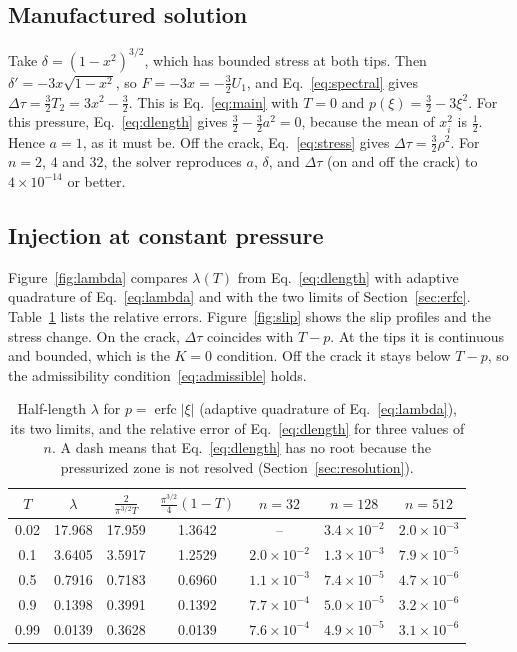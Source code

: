 \documentclass[12pt]{article}
\newcommand{\erfc}{\operatorname{erfc}}
\begin{document}
\subsection{Manufactured solution}
Take $\delta = (1-x^2)^{3/2}$, which has bounded stress at both tips. Then
$\delta' = -3x\sqrt{1-x^2}$, so $F = -3x = -\frac32U_1$, and
Eq.~\eqref{eq:spectral} gives $\Delta\tau = \frac32T_2 = 3x^2-\frac32$. This is
Eq.~\eqref{eq:main} with $T=0$ and $p(\xi) = \frac32 - 3\xi^2$. For this pressure,
Eq.~\eqref{eq:dlength} gives $\frac32 - \frac32a^2 = 0$, because the mean of
$x_i^2$ is $\frac12$. Hence $a=1$, as it must be. Off the crack,
Eq.~\eqref{eq:stress} gives $\Delta\tau = \frac32\rho^2$. For $n = 2$, $4$ and
$32$, the solver reproduces $a$, $\delta$, and $\Delta\tau$ (on and off the
crack) to $4\times10^{-14}$ or better.

\subsection{Injection at constant pressure}
Figure~\ref{fig:lambda} compares $\lambda(T)$ from Eq.~\eqref{eq:dlength} with
adaptive quadrature of Eq.~\eqref{eq:lambda} and with the two limits of
Section~\ref{sec:erfc}. Table~\ref{tab:lambda} lists the relative errors.
Figure~\ref{fig:slip} shows the slip profiles and the stress change. On the
crack, $\Delta\tau$ coincides with $T-p$. At the tips it is continuous and
bounded, which is the $K=0$ condition. Off the crack it stays below $T-p$, so
the admissibility condition~\eqref{eq:admissible} holds.

\begin{table}[H]
	\centering
	\caption{Half-length $\lambda$ for $p=\erfc|\xi|$ (adaptive quadrature of
		Eq.~\eqref{eq:lambda}), its two limits, and the relative error of
		Eq.~\eqref{eq:dlength} for three values of $n$. A dash means that
		Eq.~\eqref{eq:dlength} has no root because the pressurized zone is not
		resolved (Section~\ref{sec:resolution}).}
	\label{tab:lambda}
	\begin{tabular}{ccccccc}
		\hline
		$T$  & $\lambda$ & $\frac{2}{\pi^{3/2}T}$ & $\frac{\pi^{3/2}}{4}(1-T)$ & $n=32$             & $n=128$            & $n=512$            \\
		\hline
		0.02 & 17.968    & 17.959                 & 1.3642                     & --                 & $3.4\times10^{-2}$ & $2.0\times10^{-3}$ \\
		0.1  & 3.6405    & 3.5917                 & 1.2529                     & $2.0\times10^{-2}$ & $1.3\times10^{-3}$ & $7.9\times10^{-5}$ \\
		0.5  & 0.7916    & 0.7183                 & 0.6960                     & $1.1\times10^{-3}$ & $7.4\times10^{-5}$ & $4.7\times10^{-6}$ \\
		0.9  & 0.1398    & 0.3991                 & 0.1392                     & $7.7\times10^{-4}$ & $5.0\times10^{-5}$ & $3.2\times10^{-6}$ \\
		0.99 & 0.0139    & 0.3628                 & 0.0139                     & $7.6\times10^{-4}$ & $4.9\times10^{-5}$ & $3.1\times10^{-6}$ \\
		\hline
	\end{tabular}
\end{table}
\end{document}
